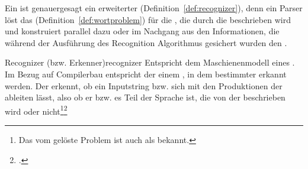 Ein  ist genauergesagt ein erweiterter  (Definition~\ref{def:recognizer}), denn ein Parser löst das  (Definition~\ref{def:wortproblem}) für die , die durch die  beschrieben wird und konstruiert parallel dazu oder im Nachgang aus den Informationen, die während der Ausführung des Recognition Algorithmus gesichert wurden den .

\begin{Definition}{Recognizer (bzw. Erkenner)}{recognizer}
  Entspricht dem Maschienenmodell eines . Im Bezug auf Compilerbau entspricht der  einem , in dem  bestimmter  erkannt werden. Der  erkennt, ob ein Inputstring bzw.  sich mit den Produktionen der  ableiten lässt, also ob er bzw. es Teil der Sprache ist, die von der  beschrieben wird oder nicht\footnote{Das vom  gelöste Problem ist auch als  bekannt.}\footcite{thiemann_compilerbau_2021}
\end{Definition}

